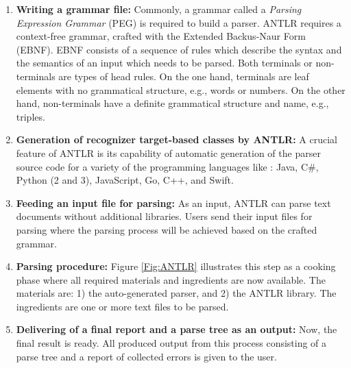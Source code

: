 \begin{enumerate}
		\item  {\bf Writing a grammar file:} Commonly, a grammar called a \emph{Parsing Expression Grammar} (PEG) is required to build a parser. 
		ANTLR requires a context-free grammar, crafted with the Extended Backus-Naur Form (EBNF). 
		EBNF consists of a sequence of rules which describe the syntax and the semantics of an input which needs to be parsed. 
		Both terminals or non-terminals are types of head rules. 
		On the one hand, terminals are leaf elements with no grammatical structure, e.g., words or numbers. On the other hand, non-terminals have a definite grammatical structure and name, e.g., triples. 

		\item {\bf Generation of recognizer target-based classes by ANTLR:} A crucial feature of ANTLR is its capability of automatic generation of the parser source code for a variety of the programming languages like \cite{ANTLR:Website:Online}: Java, C\#, Python (2 and 3), JavaScript, Go, C++, and Swift.
		
		\item {\bf Feeding an input file for parsing:} As an input, ANTLR can parse text documents without additional libraries. 
		Users send their input files for parsing where the parsing process will be achieved based on the crafted grammar.
		
		\item {\bf Parsing procedure:} {Figure \ref{Fig:ANTLR} } illustrates this step as a cooking phase where all required materials and ingredients are now available. 
		The materials are: 1) the auto-generated parser, and 2) the ANTLR library. 
		The ingredients are one or more text files to be parsed. 
		
		\item {\bf Delivering of a final report and a parse tree as an output:} Now, the final result is ready.
		All produced output from this process consisting of a parse tree and a report of collected errors is given to the user.
	\end{enumerate}











